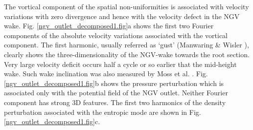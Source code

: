  The vortical component of the spatial non-uniformities is associated with
 velocity variations with zero divergence and hence with
 the velocity defect in the NGV wake.
 Fig. \ref{ngv_outlet_decomposed1.fig}a shows the first two Fourier components
 of the absolute velocity variations associated with the vortical component.
 The first harmonic, usually referred as `gust'
 (Manwaring \& Wisler ), clearly shows the
 three-dimensionality of the NGV-wake towards the root section. Very large
 velocity deficit occurs half a cycle or so earlier that the
 mid-height wake. Such wake inclination was also measured by Moss et al.
 \citeyear{Moss:1}.
 Fig. \ref{ngv_outlet_decomposed1.fig}b shows the pressure perturbation
 which is associated only with the potential field of the NGV outlet.
 Neither Fourier component has strong 3D features.
 The first two harmonics of the density perturbation associated with
 the entropic mode are shown in Fig. \ref{ngv_outlet_decomposed1.fig}c.
%
%
%
